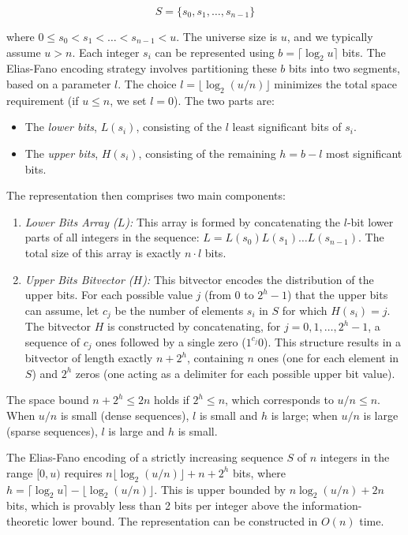 $$S = \{s_0, s_1, \ldots, s_{n-1}\}$$

where $0 \le s_0 < s_1 < \ldots < s_{n-1} < u$. The universe size is $u$, and we typically assume $u > n$. Each integer $s_i$ can be represented using $b = \lceil \log_2 u \rceil$ bits. The Elias-Fano encoding strategy involves partitioning these $b$ bits into two segments, based on a parameter $l$. The choice $l = \lfloor \log_2 (u/n) \rfloor$ minimizes the total space requirement \cite{Elias1975, ferragina2023pearls} (if $u \le n$, we set $l=0$). The two parts are:
\begin{itemize}
    \item The \emph{lower bits}, $L(s_i)$, consisting of the $l$ least significant bits of $s_i$.
    \item The \emph{upper bits}, $H(s_i)$, consisting of the remaining $h = b - l$ most significant bits.
\end{itemize}
The representation then comprises two main components:
\begin{enumerate}
    \item \emph{Lower Bits Array ($L$):} This array is formed by concatenating the $l$-bit lower parts of all integers in the sequence: $L = L(s_0)L(s_1) \ldots L(s_{n-1})$. The total size of this array is exactly $n \cdot l$ bits.
    \item \emph{Upper Bits Bitvector ($H$):} This bitvector encodes the distribution of the upper bits. For each possible value $j$ (from $0$ to $2^h-1$) that the upper bits can assume, let $c_j$ be the number of elements $s_i$ in $S$ for which $H(s_i) = j$. The bitvector $H$ is constructed by concatenating, for $j = 0, 1, \ldots, 2^h-1$, a sequence of $c_j$ ones followed by a single zero ($1^{c_j}0$). This structure results in a bitvector of length exactly $n + 2^h$, containing $n$ ones (one for each element in $S$) and $2^h$ zeros (one acting as a delimiter for each possible upper bit value).
\end{enumerate}
The space bound $n + 2^h \le 2n$ holds if $2^h \le n$, which corresponds to $u/n \le n$. When $u/n$ is small (dense sequences), $l$ is small and $h$ is large; when $u/n$ is large (sparse sequences), $l$ is large and $h$ is small.

\begin{theorem} \label{thm:ef_space_revised}
    The Elias-Fano encoding of a strictly increasing sequence $S$ of $n$ integers in the range $[0, u)$ requires $n \lfloor \log_2 (u/n) \rfloor + n + 2^h$ bits, where $h = \lceil \log_2 u \rceil - \lfloor \log_2 (u/n) \rfloor$. This is upper bounded by $n \log_2(u/n) + 2n$ bits, which is provably less than 2 bits per integer above the information-theoretic lower bound. The representation can be constructed in $O(n)$ time.
\end{theorem}

